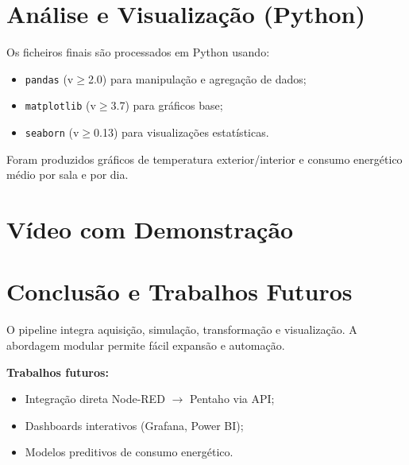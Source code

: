 \documentclass[a4paper, 12pt]{article} %
\begin{document}
\newpage
\section{Análise e Visualização (Python)}

Os ficheiros finais são processados em Python usando:
\begin{itemize}
	\item \texttt{pandas} (v$\geq$2.0) para manipulação e agregação de dados;
	\item \texttt{matplotlib} (v$\geq$3.7) para gráficos base;
	\item \texttt{seaborn} (v$\geq$0.13) para visualizações estatísticas.
\end{itemize}

Foram produzidos gráficos de temperatura exterior/interior e consumo energético médio por sala e por dia.


\newpage
\section{Vídeo com Demonstração}


\newpage
\section{Conclusão e Trabalhos Futuros}

O pipeline integra aquisição, simulação, transformação e visualização.  
A abordagem modular permite fácil expansão e automação.  

\textbf{Trabalhos futuros:}
\begin{itemize}
	\item Integração direta Node-RED \(\rightarrow\) Pentaho via API;
	\item Dashboards interativos (Grafana, Power BI);
	\item Modelos preditivos de consumo energético.
\end{itemize}

\nocite{*}

\end{document}
